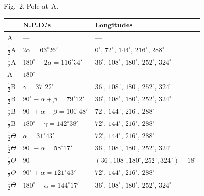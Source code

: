 \documentclass[11pt,a4paper]{book}
\begin{document}
\begin{art}
Fig.~2. Pole at~A.

\begin{center}
\begin{tabular}{|l|l|l|}
\hline
& N.P.D.'s & Longitudes \\
\hline
A & --- & --- \\
\hline
$\frac{1}{2}$A & $2\alpha = 63^\circ 26'$ & $0^\circ$, $72^\circ$, $144^\circ$, $216^\circ$, $288^\circ$ \\
$\frac{1}{2}$A & $180^\circ - 2\alpha = 116^\circ 34'$ & $36^\circ$, $108^\circ$, $180^\circ$, $252^\circ$, $324^\circ$ \\
A & $180^\circ$ & --- \\
\hline
$\frac{1}{2}$B & $\gamma = 37^\circ 22'$ & $36^\circ$, $108^\circ$, $180^\circ$, $252^\circ$, $324^\circ$ \\
$\frac{1}{2}$B & $90^\circ - \alpha + \beta = 79^\circ 12'$ & $36^\circ$, $108^\circ$, $180^\circ$, $252^\circ$, $324^\circ$ \\
$\frac{1}{2}$B & $90^\circ + \alpha - \beta = 100^\circ 48'$ & $72^\circ$, $144^\circ$, $216^\circ$, $288^\circ$ \\
$\frac{1}{2}$B & $180^\circ - \gamma = 142^\circ 38'$ & $72^\circ$, $144^\circ$, $216^\circ$, $288^\circ$ \\
\hline
$\frac{1}{2}\Theta$ & $\alpha = 31^\circ 43'$ & $72^\circ$, $144^\circ$, $216^\circ$, $288^\circ$ \\
$\frac{1}{2}\Theta$ & $90^\circ - \alpha = 58^\circ 17'$ & $36^\circ$, $108^\circ$, $180^\circ$, $252^\circ$, $324^\circ$ \\
$\frac{1}{2}\Theta$ & $90^\circ$ & $(36^\circ, 108^\circ, 180^\circ, 252^\circ, 324^\circ) + 18^\circ$ \\
$\frac{1}{2}\Theta$ & $90^\circ + \alpha = 121^\circ 43'$ & $72^\circ$, $144^\circ$, $216^\circ$, $288^\circ$ \\
$\frac{1}{2}\Theta$ & $180^\circ - \alpha = 144^\circ 17'$ & $36^\circ$, $108^\circ$, $180^\circ$, $252^\circ$, $324^\circ$ \\
\hline
\end{tabular}
\end{center}
\end{art}
\end{document}

